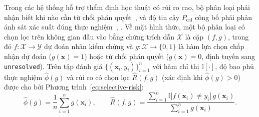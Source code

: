 Trong các hệ thống hỗ trợ thẩm định học thuật có rủi ro cao, bộ phân loại phải nhận biết khi nào cần từ chối phán quyết~\cite{chow1970optimum}, \cite{Geifman2017} và độ tin cậy $P_{\text{cal}}$ công bố phải phản ánh sát xác suất đúng thực nghiệm~\cite{niculescu2005}, \cite{guo2017}. Về mặt hình thức, một bộ phân loại có chọn lọc trên không gian đầu vào bằng chứng trích dẫn $\mathcal{X}$ là cặp $(f, g)$, trong đó $f: \mathcal{X} \to \mathcal{Y}$ dự đoán nhãn kiểm chứng và $g: \mathcal{X} \to \{0, 1\}$ là hàm lựa chọn chấp nhận dự đoán ($g(\mathbf{x}) = 1$) hoặc từ chối phán quyết ($g(\mathbf{x}) = 0$, định tuyến sang \texttt{unresolved}). Trên tập đánh giá $\{(\mathbf{x}_i, y_i)\}_{i=1}^{n}$ với hàm chỉ thị $\mathbb{I}[\cdot]$, độ bao phủ thực nghiệm $\hat{\phi}(g)$ và rủi ro có chọn lọc $\hat{R}(f, g)$ (xác định khi $\hat{\phi}(g) > 0$) được cho bởi Phương trình~\eqref{eq:selective-risk}:
\begin{equation}\label{eq:selective-risk}
\hat{\phi}(g) = \frac{1}{n}\sum_{i=1}^{n} g(\mathbf{x}_i), \qquad
\hat{R}(f, g) = \frac{\sum_{i=1}^{n} \mathbb{I}\bigl[f(\mathbf{x}_i) \neq y_i\bigr]\, g(\mathbf{x}_i)}{\sum_{i=1}^{n} g(\mathbf{x}_i)}.
\end{equation}

